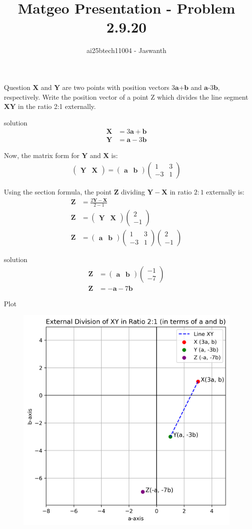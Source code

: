 \documentclass{beamer}
\title{Matgeo Presentation - Problem 2.9.20}
\author{ai25btech11004 - Jaswanth}
\numberwithin{equation}{section}
\theoremstyle{remark}
\newcommand{\myvec}[1]{\ensuremath{\begin{pmatrix}#1\end{pmatrix}}}
\let\vec\mathbf
\begin{document}
\frame{\titlepage}
\begin{frame}{Question}
$\vec{X}$ and  $\vec{Y}$ are two points with position vectors $3\vec{a}$+$\vec{b}$  and  $\vec{a}$-$3\vec{b}$, respectively. Write the position vector of a point Z  which divides the line segment  $\vec{XY}$ in the ratio 2:1 externally.\\
\end{frame}
\begin{frame}{solution}
\begin{align}
    \vec{X} &= 3\vec{a}+\vec{b}\\
    \vec{Y} &= \vec{a}-3\vec{b}
\end{align}

Now, the matrix form for $\vec{Y}$ and $\vec{X}$ is:
\begin{align}
\myvec{\vec{Y} & \vec{X}}
=\myvec{\vec{a} & \vec{b}}
\myvec{1 & 3 \\ -3 & 1}
\end{align}

Using the section formula, the point $\vec{Z}$ dividing $\vec{Y} - \vec{X}$ in ratio $2:1$ externally is:
\begin{align}
\vec{Z} &= \frac{2\vec{Y} - \vec{X}}{2-1} \\
\vec{Z} &=  \myvec{\vec{Y} & \vec{X}} \myvec{2 \\ -1} \\
\vec{Z} &=  \myvec{\vec{a} & \vec{b}}\myvec{1 & 3 \\ -3 & 1} \myvec{2 \\ -1} \end{align}
\end{frame}
\begin{frame}{solution}
\begin{align}
\vec{Z} &= \myvec{\vec{a} & \vec{b}} \myvec{-1 \\ -7} \\
\vec{Z} &= -\vec{a}-7\vec{b}  
\end{align}

\end{frame}
\begin{frame}{Plot}
    \begin{figure}[H]
    \centering
    \includegraphics[width=0.71\columnwidth]{figs/01.png}
    \label{fig-1}
\end{figure}
\end{frame}
\end{document}
